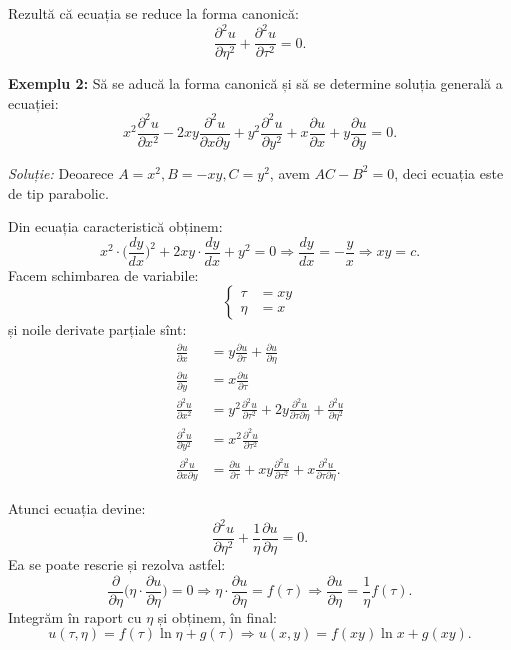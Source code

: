 \documentclass[11pt,a4paper]{article}
\theoremstyle{dotless}
\theoremstyle{dotlessdr}
\begin{document}
Rezultă că ecuația se reduce la forma canonică:
\[
  \frac{\partial^2 u}{\partial \eta^2} + \frac{\partial^2 u}{\partial \tau^2} = 0.
\]

\vspace{1cm}

\textbf{Exemplu 2:} Să se aducă la forma canonică și să se determine soluția
generală a ecuației:
\[
  x^2 \frac{\partial^2 u}{\partial x^2} - 2xy \frac{\partial^2 u}{\partial x\partial y} + %
  y^2 \frac{\partial^2 u}{\partial y^2} + x \frac{\partial u}{\partial x} + %
  y \frac{\partial u}{\partial y} = 0.
\]

\emph{Soluție:} Deoarece $ A = x^2, B = -xy, C = y^2 $, avem $ AC - B^2 = 0 $, deci
ecuația este de tip parabolic.

Din ecuația caracteristică obținem:
\[
  x^2 \cdot \Big(\frac{dy}{dx}\Big)^2 + 2xy \cdot \frac{dy}{dx} + y^2 = 0 \Rightarrow %
  \frac{dy}{dx} = -\frac{y}{x} \Rightarrow xy = c.
\]
Facem schimbarea de variabile:
\[
  \begin{cases}
    \tau &= xy \\
    \eta &= x
  \end{cases}
\]
și noile derivate parțiale sînt:
\begin{align*}
  \frac{\partial u}{\partial x} &= y\frac{\partial u}{\partial \tau} + %
                                  \frac{\partial u}{\partial \eta} \\
  \frac{\partial u}{\partial y} &= x \frac{\partial u}{\partial \tau} \\
  \frac{\partial^2 u}{\partial x^2} &= y^2 \frac{\partial^2 u}{\partial \tau^2} + %
                                      2y \frac{\partial^2 u}{\partial \tau\partial \eta} + %
                                      \frac{\partial^2 u}{\partial \eta^2} \\
  \frac{\partial^2 u}{\partial y^2} &= x^2 \frac{\partial^2 u}{\partial \tau^2} \\
  \frac{\partial^2 u}{\partial x\partial y} &= \frac{\partial u}{\partial \tau} + %
                                              xy \frac{\partial^2 u}{\partial \tau^2} + %
                                              x \frac{\partial^2 u}{\partial \tau \partial \eta}.
\end{align*}

Atunci ecuația devine:
\[
  \frac{\partial^2 u}{\partial \eta^2} + \frac{1}{\eta} \frac{\partial u}{\partial \eta} = 0.
\]
Ea se poate rescrie și rezolva astfel:
\[
  \frac{\partial}{\partial \eta} \Big( \eta \cdot \frac{\partial u}{\partial \eta} \Big) = 0 %
  \Rightarrow \eta \cdot \frac{\partial u}{\partial \eta} = f(\tau) \Rightarrow %
  \frac{\partial u}{\partial \eta} = \frac{1}{\eta} f(\tau).
\]
Integrăm în raport cu $ \eta $ și obținem, în final:
\[
  u(\tau, \eta) = f(\tau) \ln \eta + g(\tau) \Rightarrow %
  u(x, y) = f(xy) \ln x + g(xy).
\]
\end{document}
